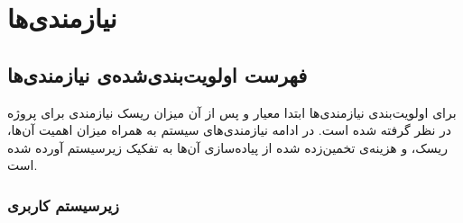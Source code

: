\chapter{نیازمندی‌ها}



\section{فهرست اولویت‌بندی‌شده‌ی نیازمندی‌ها}

 برای اولویت‌بندی نیازمندی‌ها ابتدا معیار 
و پس از آن میزان ریسک نیازمندی برای پروژه در نظر گرفته شده است. 
در ادامه نیازمندی‌های سیستم به همراه میزان اهمیت آن‌ها، ریسک، و هزینه‌ی تخمین‌زده شده از پیاده‌سازی آن‌ها به تفکیک زیرسیستم آورده شده است.

\subsection{زیرسیستم کاربری}

